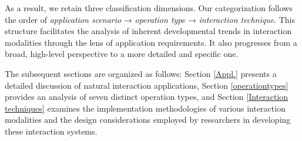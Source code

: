 \documentclass[review]{fcs}
\newcommand{\revise}[2]{\textcolor[rgb]{0,0,0}{#2}}
\begin{document}
\revise{}{As a result, we retain three classification dimensions. Our categorization follows the order of \textit{application scenario} → \textit{operation type} → \textit{interaction technique}. This structure facilitates the analysis of inherent developmental trends in interaction modalities through the lens of application requirements. It also progresses from a broad, high-level perspective to a more detailed and specific one.}






\revise{}{The subsequent sections are organized as follows: Section \ref{Appl.} presents a detailed discussion of natural interaction applications, Section \ref{operationtypes} provides an analysis of seven distinct operation types, and Section \ref{Interaction techniques} examines the implementation methodologies of various interaction modalities and the design considerations employed by researchers in developing these interaction systems.}
\end{document}
